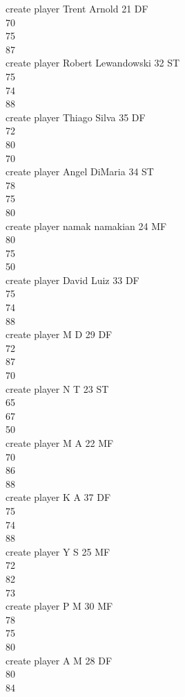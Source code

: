 \documentclass[]{article}
\begin{document}
{create player Trent Arnold 21 DF\\
70\\
75\\
87\\
create player Robert Lewandowski 32 ST\\
75\\
74\\
88\\
create player Thiago Silva 35 DF\\
72\\
80\\
70\\
create player Angel DiMaria 34 ST\\
78\\
75\\
80\\
create player namak namakian 24 MF\\
80\\
75\\
50\\
create player David Luiz 33 DF\\
75\\
74\\
88\\
create player M D 29 DF\\
72\\
87\\
70\\
create player N T 23 ST\\
65\\
67\\
50\\
create player M A 22 MF\\
70\\
86\\
88\\
create player K A 37 DF\\
75\\
74\\
88\\
create player Y S 25 MF\\
72\\
82\\
73\\
create player P M 30 MF\\
78\\
75\\
80\\
create player A M 28 DF\\
80\\
84\\
}
\end{document}
